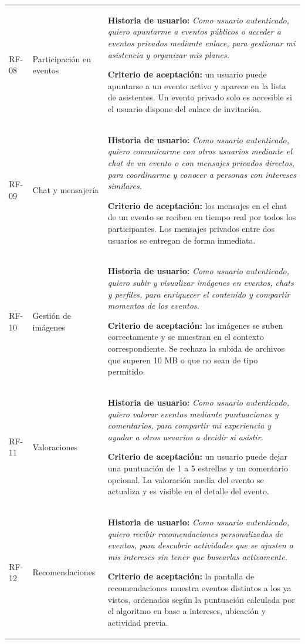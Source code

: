 {\begin{longtable}{@{}>{\raggedright\arraybackslash}p{} >{\raggedright\arraybackslash}p{} >{\raggedright\arraybackslash}p{}@{}}
\addlinespace
RF-08 & Participación en eventos & \textbf{Historia de usuario:} \textit{Como usuario autenticado, quiero apuntarme a eventos públicos o acceder a eventos privados mediante enlace, para gestionar mi asistencia y organizar mis planes.}\par\vspace{0.05cm}\textbf{Criterio de aceptación:} un usuario puede apuntarse a un evento activo y aparece en la lista de asistentes. Un evento privado solo es accesible si el usuario dispone del enlace de invitación. \\
\addlinespace
RF-09 & Chat y mensajería & \textbf{Historia de usuario:} \textit{Como usuario autenticado, quiero comunicarme con otros usuarios mediante el chat de un evento o con mensajes privados directos, para coordinarme y conocer a personas con intereses similares.}\par\vspace{0.05cm}\textbf{Criterio de aceptación:} los mensajes en el chat de un evento se reciben en tiempo real por todos los participantes. Los mensajes privados entre dos usuarios se entregan de forma inmediata. \\
\addlinespace
RF-10 & Gestión de imágenes & \textbf{Historia de usuario:} \textit{Como usuario autenticado, quiero subir y visualizar imágenes en eventos, chats y perfiles, para enriquecer el contenido y compartir momentos de los eventos.}\par\vspace{0.05cm}\textbf{Criterio de aceptación:} las imágenes se suben correctamente y se muestran en el contexto correspondiente. Se rechaza la subida de archivos que superen 10 MB o que no sean de tipo permitido. \\
\addlinespace
RF-11 & Valoraciones & \textbf{Historia de usuario:} \textit{Como usuario autenticado, quiero valorar eventos mediante puntuaciones y comentarios, para compartir mi experiencia y ayudar a otros usuarios a decidir si asistir.}\par\vspace{0.05cm}\textbf{Criterio de aceptación:} un usuario puede dejar una puntuación de 1 a 5 estrellas y un comentario opcional. La valoración media del evento se actualiza y es visible en el detalle del evento. \\
\addlinespace
RF-12 & Recomendaciones & \textbf{Historia de usuario:} \textit{Como usuario autenticado, quiero recibir recomendaciones personalizadas de eventos, para descubrir actividades que se ajusten a mis intereses sin tener que buscarlas activamente.}\par\vspace{0.05cm}\textbf{Criterio de aceptación:} la pantalla de recomendaciones muestra eventos distintos a los ya vistos, ordenados según la puntuación calculada por el algoritmo en base a intereses, ubicación y actividad previa. \\

\end{longtable}}
